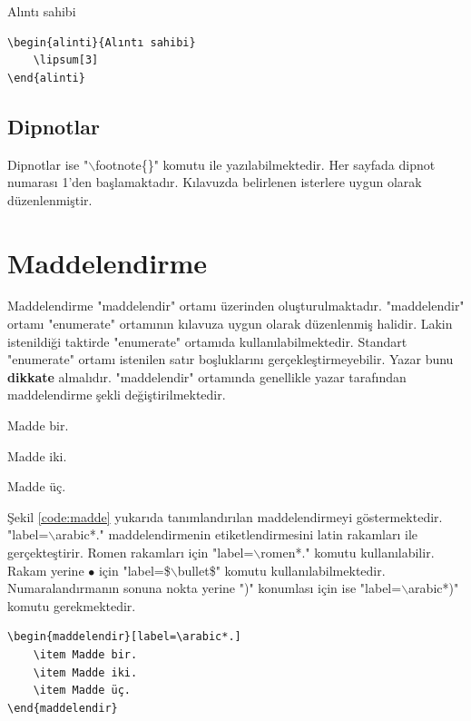 \begin{alinti}{Alıntı sahibi}
	\lipsum[3]
\end{alinti}

\begin{lstlisting}[language={[LaTeX]{TeX}}, label=code:alinti, caption=Örnek alıntı yazımı]
\begin{alinti}{Alıntı sahibi}
	\lipsum[3]
\end{alinti}
\end{lstlisting}

\section{Dipnotlar}
Dipnotlar ise "$\backslash$footnote\{\}" komutu ile yazılabilmektedir. Her sayfada dipnot numarası 1'den başlamaktadır. Kılavuzda belirlenen isterlere uygun olarak düzenlenmiştir.


\chapter{Maddelendirme}
\label{ch:madde}
Maddelendirme "maddelendir" ortamı üzerinden oluşturulmaktadır. "maddelendir" ortamı "enumerate" ortamının kılavuza uygun olarak düzenlenmiş halidir. Lakin istenildiği taktirde "enumerate" ortamıda kullanılabilmektedir. Standart "enumerate" ortamı istenilen satır boşluklarını gerçekleştirmeyebilir. Yazar bunu \textbf{dikkate} almalıdır. "maddelendir" ortamında genellikle yazar tarafından maddelendirme şekli değiştirilmektedir. 

\begin{maddelendir}[label=\arabic*.]
	\item Madde bir.
	\item Madde iki.
	\item Madde üç.
\end{maddelendir}

Şekil \ref{code:madde} yukarıda tanımlandırılan maddelendirmeyi göstermektedir. "label=$\backslash$arabic*." maddelendirmenin etiketlendirmesini latin rakamları ile gerçekteştirir. Romen rakamları için  "label=$\backslash$romen*." komutu kullanılabilir. Rakam yerine $\bullet$ için "label=\$$\backslash$bullet\$" komutu kullanılabilmektedir. Numaralandırmanın sonuna nokta yerine ")" konumlası için ise  "label=$\backslash$arabic*)" komutu gerekmektedir.

\begin{lstlisting}[language={[LaTeX]{TeX}}, label=code:madde, caption=Örnek maddelendirme]
\begin{maddelendir}[label=\arabic*.]
	\item Madde bir.
	\item Madde iki.
	\item Madde üç.
\end{maddelendir}
\end{lstlisting}

